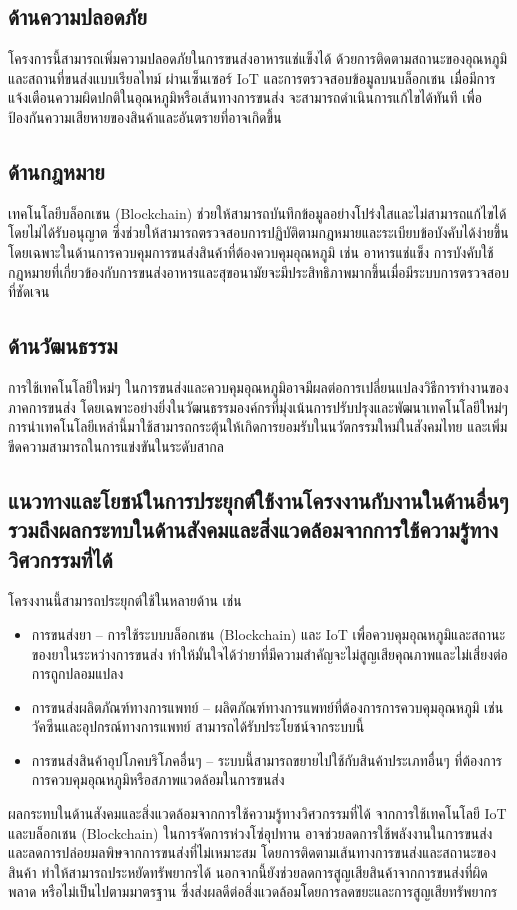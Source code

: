 \subsection{ด้านความปลอดภัย}
โครงการนี้สามารถเพิ่มความปลอดภัยในการขนส่งอาหารแช่แข็งได้ ด้วยการติดตามสถานะของอุณหภูมิและสถานที่ขนส่งแบบเรียลไทม์ ผ่านเซ็นเซอร์ IoT และการตรวจสอบข้อมูลบนบล็อกเชน เมื่อมีการแจ้งเตือนความผิดปกติในอุณหภูมิหรือเส้นทางการขนส่ง จะสามารถดำเนินการแก้ไขได้ทันที เพื่อป้องกันความเสียหายของสินค้าและอันตรายที่อาจเกิดขึ้น

\subsection{ด้านกฎหมาย}
เทคโนโลยีบล็อกเชน (Blockchain) ช่วยให้สามารถบันทึกข้อมูลอย่างโปร่งใสและไม่สามารถแก้ไขได้โดยไม่ได้รับอนุญาต ซึ่งช่วยให้สามารถตรวจสอบการปฏิบัติตามกฎหมายและระเบียบข้อบังคับได้ง่ายขึ้น โดยเฉพาะในด้านการควบคุมการขนส่งสินค้าที่ต้องควบคุมอุณหภูมิ เช่น อาหารแช่แข็ง การบังคับใช้กฎหมายที่เกี่ยวข้องกับการขนส่งอาหารและสุขอนามัยจะมีประสิทธิภาพมากขึ้นเมื่อมีระบบการตรวจสอบที่ชัดเจน

\subsection{ด้านวัฒนธรรม}
การใช้เทคโนโลยีใหม่ๆ ในการขนส่งและควบคุมอุณหภูมิอาจมีผลต่อการเปลี่ยนแปลงวิธีการทำงานของภาคการขนส่ง โดยเฉพาะอย่างยิ่งในวัฒนธรรมองค์กรที่มุ่งเน้นการปรับปรุงและพัฒนาเทคโนโลยีใหม่ๆ การนำเทคโนโลยีเหล่านี้มาใช้สามารถกระตุ้นให้เกิดการยอมรับในนวัตกรรมใหม่ในสังคมไทย และเพิ่มขีดความสามารถในการแข่งขันในระดับสากล

\subsection{แนวทางและโยชน์ในการประยุกต์ใช้งานโครงงานกับงานในด้านอื่นๆ รวมถึงผลกระทบในด้านสังคมและสิ่งแวดล้อมจากการใช้ความรู้ทางวิศวกรรมที่ได้}
โครงงานนี้สามารถประยุกต์ใช้ในหลายด้าน เช่น
\begin{itemize}
    \item การขนส่งยา – การใช้ระบบบล็อกเชน (Blockchain) และ IoT เพื่อควบคุมอุณหภูมิและสถานะของยาในระหว่างการขนส่ง ทำให้มั่นใจได้ว่ายาที่มีความสำคัญจะไม่สูญเสียคุณภาพและไม่เสี่ยงต่อการถูกปลอมแปลง
    \item การขนส่งผลิตภัณฑ์ทางการแพทย์ – ผลิตภัณฑ์ทางการแพทย์ที่ต้องการการควบคุมอุณหภูมิ เช่น วัคซีนและอุปกรณ์ทางการแพทย์ สามารถได้รับประโยชน์จากระบบนี้
    \item การขนส่งสินค้าอุปโภคบริโภคอื่นๆ – ระบบนี้สามารถขยายไปใช้กับสินค้าประเภทอื่นๆ ที่ต้องการการควบคุมอุณหภูมิหรือสภาพแวดล้อมในการขนส่ง
\end{itemize}

ผลกระทบในด้านสังคมและสิ่งแวดล้อมจากการใช้ความรู้ทางวิศวกรรมที่ได้
จากการใช้เทคโนโลยี IoT และบล็อกเชน (Blockchain) ในการจัดการห่วงโซ่อุปทาน อาจช่วยลดการใช้พลังงานในการขนส่งและลดการปล่อยมลพิษจากการขนส่งที่ไม่เหมาะสม โดยการติดตามเส้นทางการขนส่งและสถานะของสินค้า ทำให้สามารถประหยัดทรัพยากรได้ นอกจากนี้ยังช่วยลดการสูญเสียสินค้าจากการขนส่งที่ผิดพลาด หรือไม่เป็นไปตามมาตรฐาน ซึ่งส่งผลดีต่อสิ่งแวดล้อมโดยการลดขยะและการสูญเสียทรัพยากร
